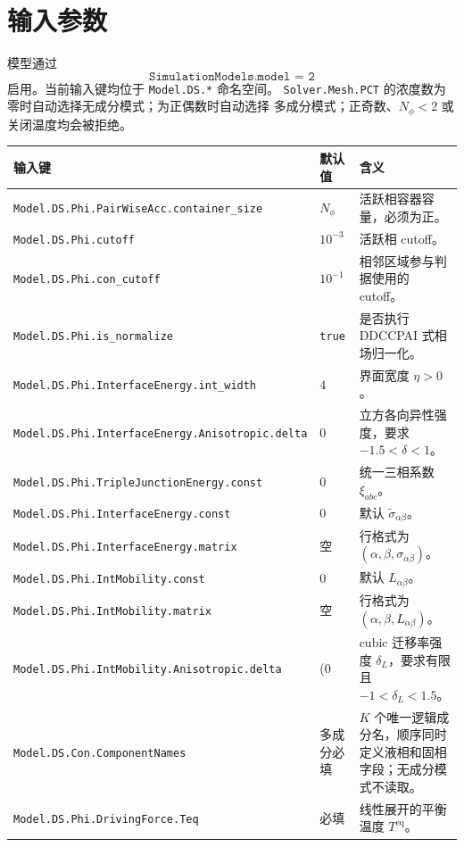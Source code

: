 \documentclass[UTF8,a4paper,11pt]{ctexart}
\begin{document}
\section{输入参数}

模型通过
\[
 \texttt{SimulationModels.model = 2}
\]
启用。当前输入键均位于 \texttt{Model.DS.*} 命名空间。
\texttt{Solver.Mesh.PCT} 的浓度数为零时自动选择无成分模式；为正偶数时自动选择
多成分模式；正奇数、\(N_\phi<2\) 或关闭温度均会被拒绝。

\begin{longtable}{p{}p{}p{}}
\toprule
输入键 & 默认值 & 含义\\
\midrule
\endhead
\texttt{Model.DS.Phi.PairWiseAcc.container\_size}
  & \(N_\phi\) & 活跃相容器容量，必须为正。\\
\texttt{Model.DS.Phi.cutoff}
  & \(10^{-3}\) & 活跃相 cutoff。\\
\texttt{Model.DS.Phi.con\_cutoff}
  & \(10^{-1}\) & 相邻区域参与判据使用的 cutoff。\\
\texttt{Model.DS.Phi.is\_normalize}
  & \texttt{true} & 是否执行 DDCCPAI 式相场归一化。\\
\texttt{Model.DS.Phi.InterfaceEnergy.int\_width}
  & \(4\) & 界面宽度 \(\eta>0\)。\\
\texttt{Model.DS.Phi.InterfaceEnergy.Anisotropic.delta}
  & \(0\) & 立方各向异性强度，要求 \(-1.5<\delta<1\)。\\
\texttt{Model.DS.Phi.TripleJunctionEnergy.const}
  & \(0\) & 统一三相系数 \(\xi_{abc}\)。\\
\texttt{Model.DS.Phi.InterfaceEnergy.const}
  & \(0\) & 默认 \(\widetilde\sigma_{\alpha\beta}\)。\\
\texttt{Model.DS.Phi.InterfaceEnergy.matrix}
  & 空 & 行格式为 \((\alpha,\beta,\sigma_{\alpha\beta})\)。\\
\texttt{Model.DS.Phi.IntMobility.const}
  & \(0\) & 默认 \(L_{\alpha\beta}\)。\\
\texttt{Model.DS.Phi.IntMobility.matrix}
  & 空 & 行格式为 \((\alpha,\beta,L_{\alpha\beta})\)。\\
\texttt{Model.DS.Phi.IntMobility.Anisotropic.delta}
  & (0\) & cubic 迁移率强度 \(\delta_L\)，要求有限且 \(-1<\delta_L<1.5\)。\\
\texttt{Model.DS.Con.ComponentNames}
  & 多成分必填 & \(K\) 个唯一逻辑成分名，顺序同时定义液相和固相字段；无成分模式不读取。\\
\texttt{Model.DS.Phi.DrivingForce.Teq}
  & 必填 & 线性展开的平衡温度 \(T^{\mathrm{eq}}\)。\\

\end{longtable}
\end{document}
